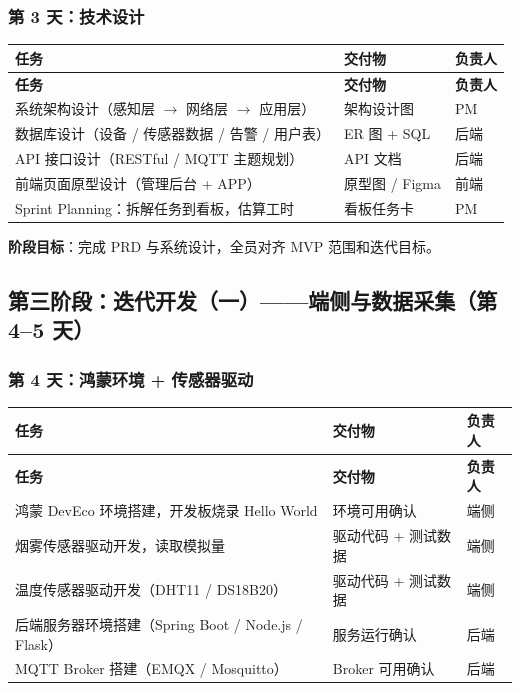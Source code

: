 \documentclass[UTF8,12pt,a4paper]{ctexart}
\begin{document}
\subsubsection{第 3 天：技术设计}

\begin{longtable}{L{6cm}L{4.5cm}C{2.5cm}}
\toprule
\textbf{任务} & \textbf{交付物} & \textbf{负责人} \\
\midrule
\endfirsthead
\toprule
\textbf{任务} & \textbf{交付物} & \textbf{负责人} \\
\midrule
\endhead
\bottomrule
\endfoot

系统架构设计（感知层 $\rightarrow$ 网络层 $\rightarrow$ 应用层） & 架构设计图 & PM \\
\midrule
数据库设计（设备 / 传感器数据 / 告警 / 用户表） & ER 图 + SQL & 后端 \\
\midrule
API 接口设计（RESTful / MQTT 主题规划） & API 文档 & 后端 \\
\midrule
前端页面原型设计（管理后台 + APP） & 原型图 / Figma & 前端 \\
\midrule
Sprint Planning：拆解任务到看板，估算工时 & 看板任务卡 & PM \\
\bottomrule
\end{longtable}

\textbf{阶段目标}：完成 PRD 与系统设计，全员对齐 MVP 范围和迭代目标。

\subsection{第三阶段：迭代开发（一）——端侧与数据采集（第 4--5 天）}

\subsubsection{第 4 天：鸿蒙环境 + 传感器驱动}

\begin{longtable}{L{6cm}L{4.5cm}C{2.5cm}}
\toprule
\textbf{任务} & \textbf{交付物} & \textbf{负责人} \\
\midrule
\endfirsthead
\toprule
\textbf{任务} & \textbf{交付物} & \textbf{负责人} \\
\midrule
\endhead
\bottomrule
\endfoot

鸿蒙 DevEco 环境搭建，开发板烧录 Hello World & 环境可用确认 & 端侧 \\
\midrule
烟雾传感器驱动开发，读取模拟量 & 驱动代码 + 测试数据 & 端侧 \\
\midrule
温度传感器驱动开发（DHT11 / DS18B20） & 驱动代码 + 测试数据 & 端侧 \\
\midrule
后端服务器环境搭建（Spring Boot / Node.js / Flask） & 服务运行确认 & 后端 \\
\midrule
MQTT Broker 搭建（EMQX / Mosquitto） & Broker 可用确认 & 后端 \\
\bottomrule
\end{longtable}
\end{document}
